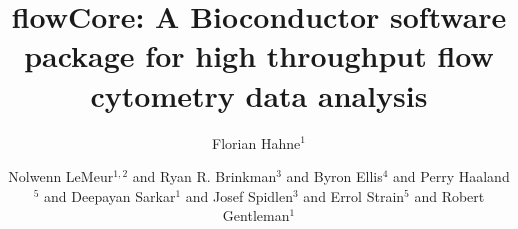 \documentclass[10pt]{bmc_article}
\newenvironment{bmcformat}{\begin{raggedright}\baselineskip20pt\sloppy\setboolean{publ}{false}}{\end{raggedright}\baselineskip20pt\sloppy}
\begin{document}
\begin{bmcformat}



\title{flowCore: A Bioconductor software package for high throughput
  flow cytometry data analysis}
 


\author{Florian Hahne\correspondingauthor$^{1}$%
      \and
         Nolwenn LeMeur\correspondingauthor$^{1,2}$%
       and 
         Ryan R. Brinkman$^3$%
       and
          Byron Ellis$^4$%
       and
          Perry Haaland$^5$%
       and
          Deepayan Sarkar$^{1}$%
       and
         Josef Spidlen$^3$%
       and
         Errol Strain$^5$%
       and
          Robert Gentleman$^{1}$%
      }
      


\address{%
    \iid(1)Life Sciences Department, Computational Biology Program,%
    Division of Public Health Sciences, Fred Hutchinson Cancer Research Center,%
    1100 Fairview Ave. N, M2-B876, PO Box 19024,  Seattle, Washington 98109-1024\\
    \iid(2)INSERM, IRISA - Symbiose, Campus Beaulieu, Université de Rennes I, %
    35042 Rennes Cedex,France \\
    \iid(3) Terry Fox Laboratory, British Columbia Cancer Agency Research Centre, %
    675 West 10th Avenue, Vancouver, BC V5Z 1L3  Canada, Canada\\
    \iid(4) AdBrite Inc\\
    \iid(5) BD Biosciences\\

}
\end{bmcformat}
\end{document}
